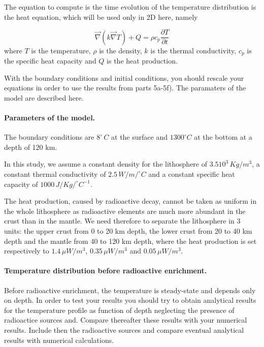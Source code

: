 \documentclass[%
oneside,                 %
final,                   %
10pt]{article}
\begin{document}
The equation to compute is the time evolution of the temperature distribution is the heat equation, which will be used only in 2D here, namely

\begin{equation}
\vec \nabla(k \vec \nabla T) + Q = \rho c_p \frac{\partial T}{\partial t} 
\label{eq:heat2D}
\end{equation}
where $T$ is the temperature, $\rho$ is the density, $k$ is the thermal conductivity, $c_p$ is the specific heat capacity and $Q$ is the heat production.

With the boundary conditions and initial conditions, you should rescale your equations in order to use the results from parts 5a-5f). The paramaters of the model are described here.

\paragraph{Parameters of the model.}
The boundary conditions are $8^{\circ}\,C$ at the surface and $1300^{\circ}C$ at the bottom at a depth of 120 km.

In this study, we assume a constant density for the lithosphere of $3.5 10^3\,Kg/m^3$,
a constant thermal conductivity of $2.5\,W/m/^{\circ}C$
and a constant specific heat capacity of $1000\,J/Kg/^{\circ}C^{-1}$.

The heat production, caused by radioactive decay, cannot be taken as uniform in the whole lithosphere as radioactive elements are much more abundant in the crust than in the mantle.
We need therefore to separate the lithosphere in 3 units: the upper crust from 0 to 20 km depth, the lower crust from 20 to 40 km depth and the mantle from 40 to 120 km depth, where the heat production is set respectively to $1.4\,\mu W/m^3$, $0.35\,\mu W/m^3$ and $0.05\,\mu W/m^3$. 

\paragraph{Temperature distribution before radioactive enrichment.}
Before radioactive enrichment, the temperature is steady-state and depends only on depth. In order to test your results you should
try to obtain analytical results for  the temperature profile as function of depth neglecting the presence of radioactice sources and. Compare thereafter these results with your numerical results.  Include then the radioactive sources and compare eventual analytical results with numerical calculations.
\end{document}

